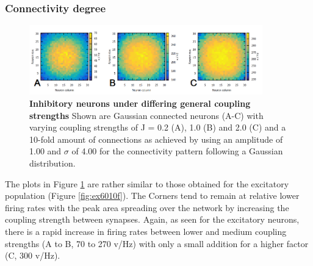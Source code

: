 \documentclass[14pt]{SelfArx} %
\numberwithin{equation}{section}
\begin{document}
\subsubsection{Connectivity degree}
\begin{figure} [htb]
\centering
\includegraphics[width = 0.9\textwidth]{in_60_10fold.png}
\caption{\textbf{Inhibitory neurons under differing general coupling strengths} Shown are Gaussian connected neurons (A-C) with varying coupling strengths of J = 0.2 (A), 1.0 (B) and 2.0 (C) and a 10-fold amount of connections as achieved by using an amplitude of 1.00 and $\sigma$ of 4.00 for the connectivity pattern following a Gaussian distribution.}
\label{fig:in6010f}
\end{figure}
The plots in Figure \ref{fig:in6010f} are rather similar to those obtained for the excitatory population (Figure \ref{fig:ex6010f}). The Corners tend to remain at relative lower firing rates with the peak area spreading over the network by increasing the coupling strength between synapses. Again, as seen for the excitatory neurons, there is a rapid increase in firing rates between lower and medium coupling strengths (A to B, 70 to 270 v/Hz) with only a small addition for a higher factor (C, 300 v/Hz). 
\end{document}
